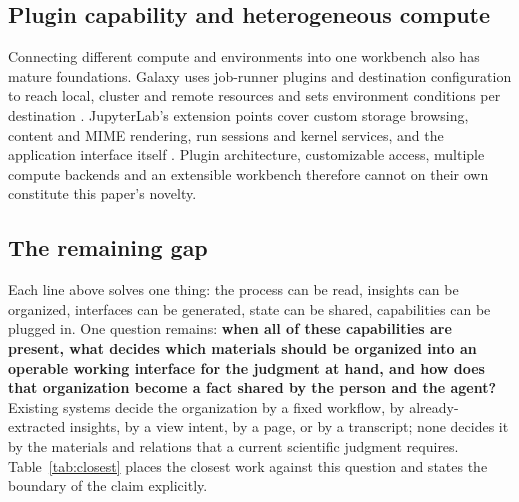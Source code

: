\documentclass[11pt]{article}
\begin{document}
\subsection{Plugin capability and heterogeneous compute}\label{rw-plugins}

Connecting different compute and environments into one workbench also has mature foundations. Galaxy uses job-runner plugins and destination configuration to reach local, cluster and remote resources and sets environment conditions per destination \cite{galaxy}. JupyterLab's extension points cover custom storage browsing, content and MIME rendering, run sessions and kernel services, and the application interface itself \cite{jupyterlab}. Plugin architecture, customizable access, multiple compute backends and an extensible workbench therefore cannot on their own constitute this paper's novelty.

\subsection{The remaining gap}\label{rw-gap}

Each line above solves one thing: the process can be read, insights can be organized, interfaces can be generated, state can be shared, capabilities can be plugged in. One question remains: \textbf{when all of these capabilities are present, what decides which materials should be organized into an operable working interface for the judgment at hand, and how does that organization become a fact shared by the person and the agent?} Existing systems decide the organization by a fixed workflow, by already-extracted insights, by a view intent, by a page, or by a transcript; none decides it by the materials and relations that a current scientific judgment requires. Table~\ref{tab:closest} places the closest work against this question and states the boundary of the claim explicitly.
\end{document}
